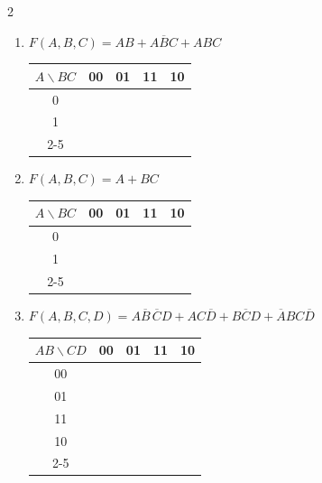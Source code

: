 \documentclass[12pt,a4paper]{article}
\begin{document}
\begin{multicols}{2}
\begin{enumerate}[label=\alph*)]
  \item \begin{minipage}[t]{\linewidth}
    $F(A,B,C) = AB + A\overline{B}C + ABC$

    \begin{center}
      \begin{tabular}{c|c|c|c|c|}
        $A \backslash BC$ & 00 & 01 & 11 & \multicolumn{1}{c}{10} \\
        \hline
        0 & \phantom{0} & \phantom{0} & \phantom{0} & \phantom{0} \\
        \hline
        1 & \phantom{0} & \phantom{0} & \phantom{0} & \phantom{0} \\
        \cline{2-5}
      \end{tabular}
    \end{center}
  \end{minipage}

  \item \begin{minipage}[t]{\linewidth}
    $F(A,B,C) = A + BC$

    \begin{center}
      \begin{tabular}{c|c|c|c|c|}
        $A \backslash BC$ & 00 & 01 & 11 & \multicolumn{1}{c}{10} \\
        \hline
        0 & \phantom{0} & \phantom{0} & \phantom{0} & \phantom{0} \\
        \hline
        1 & \phantom{0} & \phantom{0} & \phantom{0} & \phantom{0} \\
        \cline{2-5}
      \end{tabular}
    \end{center}
  \end{minipage}

  \item \begin{minipage}[t]{\linewidth}
    {\small $F(A,B,C,D) = A\overline{B}\,\overline{C}D + AC\overline{D} + B\overline{C}D + \overline{A}BC\overline{D}$}

    \begin{center}
      \begin{tabular}{c|c|c|c|c|}
        $AB \backslash CD$ & 00 & 01 & 11 & \multicolumn{1}{c}{10} \\
        \hline
        00 & \phantom{0} & \phantom{0} & \phantom{0} & \phantom{0} \\
        \hline
        01 & \phantom{0} & \phantom{0} & \phantom{0} & \phantom{0} \\
        \hline
        11 & \phantom{0} & \phantom{0} & \phantom{0} & \phantom{0} \\
        \hline
        10 & \phantom{0} & \phantom{0} & \phantom{0} & \phantom{0} \\
        \cline{2-5}
      \end{tabular}
    \end{center}
  \end{minipage}


\end{enumerate}
\end{multicols}
\end{document}
